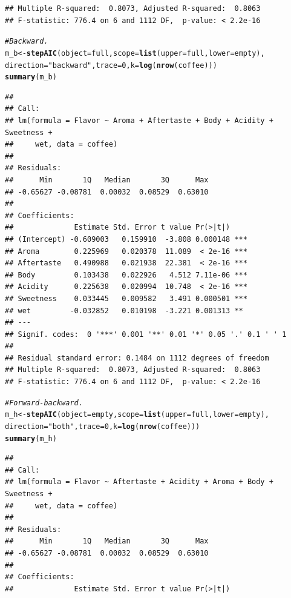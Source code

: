 \documentclass[oneside]{book}\usepackage[]{graphicx}\usepackage[dvipsnames,table,xcdraw]{xcolor}
\makeatletter
\newcommand{\hlnum}[1]{\textcolor[rgb]{0.686,0.059,0.569}{#1}}%
\newcommand{\hlstr}[1]{\textcolor[rgb]{0.192,0.494,0.8}{#1}}%
\newcommand{\hlcom}[1]{\textcolor[rgb]{0.678,0.584,0.686}{\textit{#1}}}%
\newcommand{\hlstd}[1]{\textcolor[rgb]{0.345,0.345,0.345}{#1}}%
\newcommand{\hlkwb}[1]{\textcolor[rgb]{0.69,0.353,0.396}{#1}}%
\newcommand{\hlkwc}[1]{\textcolor[rgb]{0.333,0.667,0.333}{#1}}%
\newcommand{\hlkwd}[1]{\textcolor[rgb]{0.737,0.353,0.396}{\textbf{#1}}}%
\newenvironment{kframe}{%
 \def\at@end@of@kframe{}%
 \ifinner\ifhmode%
  \def\at@end@of@kframe{\end{minipage}}%
  \begin{minipage}{\columnwidth}%
 \fi\fi%
 \def\FrameCommand##1{\hskip\@totalleftmargin \hskip-\fboxsep
 \colorbox{shadecolor}{##1}\hskip-\fboxsep
     \hskip-\linewidth \hskip-\@totalleftmargin \hskip\columnwidth}%
 \MakeFramed {\advance\hsize-\width
   \@totalleftmargin\z@ \linewidth\hsize
   \@setminipage}}%
 {\par\unskip\endMakeFramed%
 \at@end@of@kframe}
\newenvironment{knitrout}{}{} %
\makeatother
\begin{document}
\begin{knitrout}
\begin{kframe}
\begin{verbatim}
## Multiple R-squared:  0.8073,	Adjusted R-squared:  0.8063 
## F-statistic: 776.4 on 6 and 1112 DF,  p-value: < 2.2e-16
\end{verbatim}
\begin{alltt}
\hlcom{# Backward.}
\hlstd{m_b} \hlkwb{<-} \hlkwd{stepAIC}\hlstd{(}\hlkwc{object} \hlstd{= full,} \hlkwc{scope} \hlstd{=} \hlkwd{list}\hlstd{(}\hlkwc{upper} \hlstd{= full,} \hlkwc{lower} \hlstd{= empty),}
  \hlkwc{direction} \hlstd{=} \hlstr{"backward"}\hlstd{,} \hlkwc{trace} \hlstd{=} \hlnum{0}\hlstd{,} \hlkwc{k} \hlstd{=} \hlkwd{log}\hlstd{(}\hlkwd{nrow}\hlstd{(coffee)))}
\hlkwd{summary}\hlstd{(m_b)}
\end{alltt}
\begin{verbatim}
## 
## Call:
## lm(formula = Flavor ~ Aroma + Aftertaste + Body + Acidity + Sweetness + 
##     wet, data = coffee)
## 
## Residuals:
##      Min       1Q   Median       3Q      Max 
## -0.65627 -0.08781  0.00032  0.08529  0.63010 
## 
## Coefficients:
##              Estimate Std. Error t value Pr(>|t|)    
## (Intercept) -0.609003   0.159910  -3.808 0.000148 ***
## Aroma        0.225969   0.020378  11.089  < 2e-16 ***
## Aftertaste   0.490988   0.021938  22.381  < 2e-16 ***
## Body         0.103438   0.022926   4.512 7.11e-06 ***
## Acidity      0.225638   0.020994  10.748  < 2e-16 ***
## Sweetness    0.033445   0.009582   3.491 0.000501 ***
## wet         -0.032852   0.010198  -3.221 0.001313 ** 
## ---
## Signif. codes:  0 '***' 0.001 '**' 0.01 '*' 0.05 '.' 0.1 ' ' 1
## 
## Residual standard error: 0.1484 on 1112 degrees of freedom
## Multiple R-squared:  0.8073,	Adjusted R-squared:  0.8063 
## F-statistic: 776.4 on 6 and 1112 DF,  p-value: < 2.2e-16
\end{verbatim}
\begin{alltt}
\hlcom{# Forward-backward.}
\hlstd{m_h} \hlkwb{<-} \hlkwd{stepAIC}\hlstd{(}\hlkwc{object} \hlstd{= empty,} \hlkwc{scope} \hlstd{=} \hlkwd{list}\hlstd{(}\hlkwc{upper} \hlstd{= full,} \hlkwc{lower} \hlstd{= empty),}
  \hlkwc{direction} \hlstd{=} \hlstr{"both"}\hlstd{,} \hlkwc{trace} \hlstd{=} \hlnum{0}\hlstd{,} \hlkwc{k} \hlstd{=} \hlkwd{log}\hlstd{(}\hlkwd{nrow}\hlstd{(coffee)))}
\hlkwd{summary}\hlstd{(m_h)}
\end{alltt}
\begin{verbatim}
## 
## Call:
## lm(formula = Flavor ~ Aftertaste + Acidity + Aroma + Body + Sweetness + 
##     wet, data = coffee)
## 
## Residuals:
##      Min       1Q   Median       3Q      Max 
## -0.65627 -0.08781  0.00032  0.08529  0.63010 
## 
## Coefficients:
##              Estimate Std. Error t value Pr(>|t|)    

\end{verbatim}
\end{kframe}
\end{knitrout}
\end{document}
